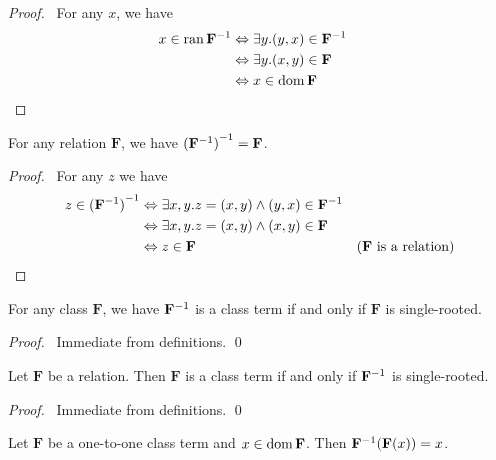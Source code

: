 \begin{proof}
    \pf\ For any $x$, we have
    \begin{align*}
        x \in \operatorname{ran} {\mathbf{F}}^{-1} & \Leftrightarrow \exists y. (y,x) \in {\mathbf{F}}^{-1} \\
        & \Leftrightarrow \exists y. (x,y) \in \mathbf{F} \\
        & \Leftrightarrow x \in \operatorname{dom} \mathbf{F} & \relax
    \end{align*}
\end{proof}

\begin{theorem}[Pairing]
    \label{theorem:inv_inv}
    For any relation $\mathbf{F}$, we have ${({\mathbf{F}}^{-1})}^{-1} = \mathbf{F}$.
\end{theorem}

\begin{proof}
    \pf\ For any $z$ we have
    \begin{align*}
        z \in {(\ensuremath{{\mathbf{F}}^{-1}})}^{-1} & \Leftrightarrow \exists x, y. z = (x,y) \wedge (y,x) \in {\mathbf{F}}^{-1} \\
        & \Leftrightarrow \exists x,y. z = (x,y) \wedge (x,y) \in \mathbf{F} \\
        & \Leftrightarrow z \in \mathbf{F} & (\text{$\mathbf{F}$ is a relation}) \relax
    \end{align*}
\end{proof}

\begin{theorem}[Pairing]
    \label{theorem:inv_function}
    For any class $\mathbf{F}$, we have ${\mathbf{F}}^{-1}$ is a class term if and only if $\mathbf{F}$ is single-rooted.
\end{theorem}

\begin{proof}
    \pf\ Immediate from definitions. \qed
\end{proof}

\begin{theorem}[Pairing]
    Let $\mathbf{F}$ be a relation. Then $\mathbf{F}$ is a class term if and only if ${\mathbf{F}}^{-1}$ is single-rooted.
\end{theorem}

\begin{proof}
    \pf\ Immediate from definitions. \qed
\end{proof}

\begin{theorem}[Pairing]
    \label{theorem:inv_F_of_F}
    Let $\mathbf{F}$ be a one-to-one class term and $x \in \operatorname{dom} \mathbf{F}$.
    Then ${\mathbf{F}}^{-1}(\mathbf{F}(x)) = x$.
\end{theorem}

